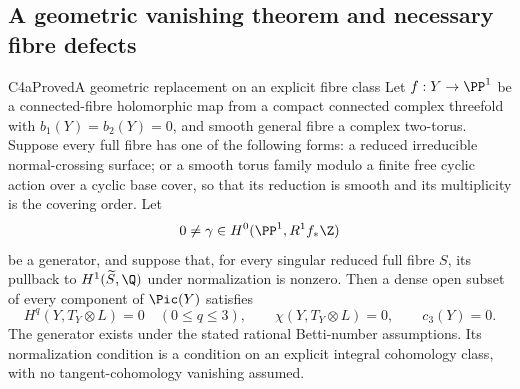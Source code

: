 \subsection{A geometric vanishing theorem and necessary fibre defects}

\begin{statement}{C4a}{Proved}{A geometric replacement on an explicit fibre class}
Let $f:Y\to\PP^1$ be a connected-fibre holomorphic map from a compact connected complex threefold with $b_1(Y)=b_2(Y)=0$, and smooth general fibre a complex two-torus. Suppose every full fibre has one of the following forms: a reduced irreducible normal-crossing surface; or a smooth torus family modulo a finite free cyclic action over a cyclic base cover, so that its reduction is smooth and its multiplicity is the covering order. Let
\[
 0\ne\gamma\in H^0(\PP^1,R^1f_*\Z)
\]
be a generator, and suppose that, for every singular reduced full fibre $S$, its pullback to $H^1(\widetilde S,\Q)$ under normalization is nonzero. Then a dense open subset of every component of $\Pic(Y)$ satisfies
\[
 H^q(Y,T_Y\otimes L)=0\quad(0\le q\le3),\qquad
 \chi(Y,T_Y\otimes L)=0,\qquad c_3(Y)=0.                \tag{C.15}
\]
The generator exists under the stated rational Betti-number assumptions. Its normalization condition is a condition on an explicit integral cohomology class, with no tangent-cohomology vanishing assumed.
\end{statement}
